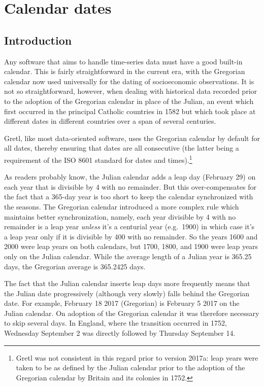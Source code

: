 \chapter{Calendar dates}
\label{chap:calendar}

\section{Introduction}
\label{cal-intro}

Any software that aims to handle time-series data must have a good
built-in calendar. This is fairly straightforward in the current era,
with the Gregorian calendar now used universally for the dating of
socioeconomic observations. It is not so straightforward, however,
when dealing with historical data recorded prior to the adoption of
the Gregorian calendar in place of the Julian, an event which first
occurred in the principal Catholic countries in 1582 but which took
place at different dates in different countries over a span of several
centuries.

Gretl, like most data-oriented software, uses the Gregorian calendar
by default for all dates, thereby ensuring that dates are all
consecutive (the latter being a requirement of the ISO 8601 standard
for dates and times).\footnote{Gretl was not consistent in this regard
  prior to version 2017a: leap years were taken to be as defined by
  the Julian calendar prior to the adoption of the Gregorian calendar
  by Britain and its colonies in 1752.}

As readers probably know, the Julian calendar adds a leap day
(February 29) on each year that is divisible by 4 with no
remainder. But this over-compensates for the fact that a 365-day year
is too short to keep the calendar synchronized with the seasons. The
Gregorian calendar introduced a more complex rule which maintains
better synchronization, namely, each year divisible by 4 with no
remainder is a leap year \textit{unless} it's a centurial year (e.g.\
1900) in which case it's a leap year only if it is divisible by 400
with no remainder.  So the years 1600 and 2000 were leap years on both
calendars, but 1700, 1800, and 1900 were leap years only on the Julian
calendar. While the average length of a Julian year is 365.25 days,
the Gregorian average is 365.2425 days. 

The fact that the Julian calendar inserts leap days more frequently
means that the Julian date progressively (although very slowly) falls
behind the Gregorian date. For example, February 18 2017 (Gregorian)
is February 5 2017 on the Julian calendar. On adoption of the
Gregorian calendar it was therefore necessary to skip several days. In
England, where the transition occurred in 1752, Wednesday September 2
was directly followed by Thursday September 14.

